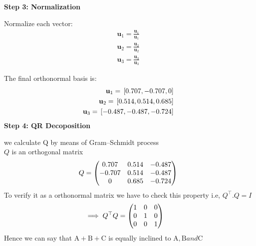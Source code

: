 \documentclass[11pt]{book}
\begin{document}
\begin{enumerate}
\textbf{Step 3: Normalization}

Normalize each vector:
\begin{align}
\mathbf{u}_1 = \frac{\mathbf{u}_1}{\mathbf{u}_1} \\
\mathbf{u}_2 = \frac{\mathbf{u}_2}{\mathbf{u}_2} \\
\mathbf{u}_3 = \frac{\mathbf{u}_3}{\mathbf{u}_3} 
\end{align}

The final orthonormal basis is:
\begin{align}
\mathbf{u}_1 = {}\left[0.707,-0.707,0\right]\\
\mathbf{u}_2 = {}\left[0.514,0.514,0.685\right]\\
\mathbf{u}_3 = {}\left[-0.487,-0.487,-0.724\right]\\
\end{align}
\textbf{Step 4: QR Decoposition}

we calculate Q by means of Gram–Schmidt process\\
$Q$ is an orthogonal matrix 
\begin{align*}
    Q=\begin{pmatrix} 0.707&0.514&-0.487\\-0.707&0.514&-0.487\\0&0.685&-0.724\end{pmatrix}
\end{align*}
To verify it as a orthonormal matrix we have to check this property i.e,  $Q^{\top}.Q =I$
\begin{align*}
    \implies Q^\top Q &= \begin{pmatrix}1&0&0\\0&1&0\\0&0&1\end{pmatrix}
\end{align*}
Hence  we can say that $\text{A}+\text{B}+\text{C} $ is equally inclined to $ \text{A},\text{B} and \text{C}$    \end{enumerate}
\end{document}
